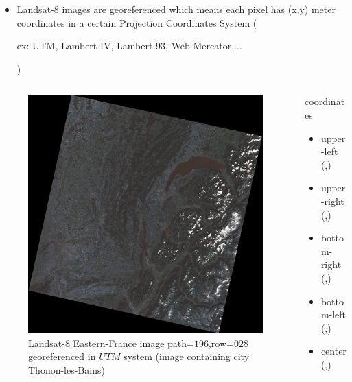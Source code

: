 \documentclass[c]{beamer}
\begin{document}
\begin{frame}
\begin{itemize}
 \item Landsat-8 images are georeferenced which means each pixel has (x,y) meter coordinates in a certain Projection Coordinates 
System (\begin{itshape}ex: UTM, Lambert IV, Lambert 93, Web Mercator,...\end{itshape})
\end{itemize}
\begin{columns}

\begin{column}{5cm}
\begin{figure}
  \includegraphics[scale=0.2]{images/georeferencing/Thonon_landsat.png}
  \caption{Landsat-8 Eastern-France image path=$196$,row=$028$ georeferenced in $UTM$ system (image containing city Thonon-les-Bains)}
\end{figure}
\end{column}

\begin{column}{5cm}
\begin{block}{coordinates}
 \begin{itemize}
  \item upper-left (,)\\
  \item upper-right (,)\\
  \item bottom-right (,)\\
  \item bottom-left (,)\\
  \item center (,)\\
  \end{itemize}
 \end{block}
\end{column}

\end{columns}

\end{frame}
\end{document}
